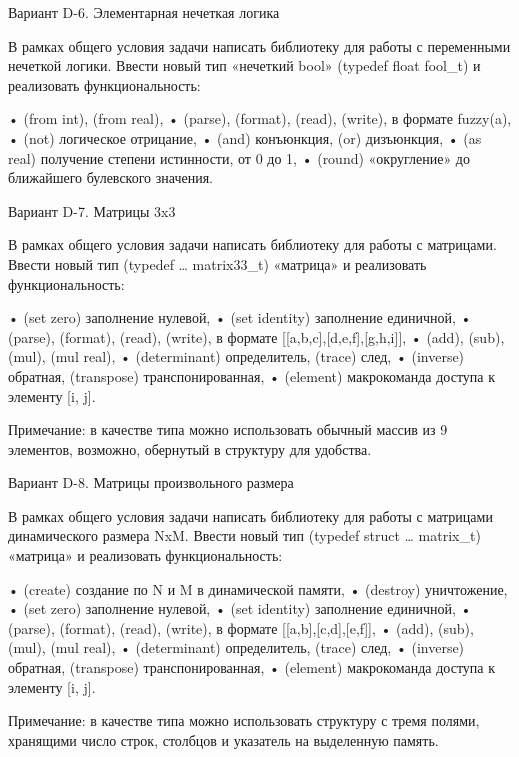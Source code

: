 
Вариант D-6. Элементарная нечеткая логика

В рамках общего условия задачи написать библиотеку для работы с переменными
нечеткой логики. Ввести новый тип «нечеткий bool» (typedef float fool_t) и
реализовать функциональность:

•	(from int), (from real),
•	(parse), (format), (read), (write), в формате fuzzy(a),
•	(not) логическое отрицание,
•	(and) конъюнкция, (or) дизъюнкция,
•	(as real) получение степени истинности, от 0 до 1,
•	(round) «округление» до ближайшего булевского значения.


Вариант D-7. Матрицы 3x3

В рамках общего условия задачи написать библиотеку для работы с матрицами.
Ввести новый тип (typedef … matrix33_t) «матрица» и реализовать
функциональность:

•	(set zero) заполнение нулевой,
•	(set identity) заполнение единичной,
•	(parse), (format), (read), (write), в формате [[a,b,c],[d,e,f],[g,h,i]],
•	(add), (sub), (mul), (mul real),
•	(determinant) определитель, (trace) след,
•	(inverse) обратная, (transpose) транспонированная,
•	(element) макрокоманда доступа к элементу [i, j].

Примечание: в качестве типа можно использовать обычный массив из 9 элементов,
возможно, обернутый в структуру для удобства.


Вариант D-8. Матрицы произвольного размера

В рамках общего условия задачи написать библиотеку для работы с матрицами
динамического размера NxM. Ввести новый тип (typedef struct … matrix_t)
«матрица» и реализовать функциональность:

•	(create) создание по N и M в динамической памяти,
•	(destroy) уничтожение,
•	(set zero) заполнение нулевой,
•	(set identity) заполнение единичной, 
•	(parse), (format), (read), (write), в формате [[a,b],[c,d],[e,f]],
•	(add), (sub), (mul), (mul real),
•	(determinant) определитель, (trace) след,
•	(inverse) обратная, (transpose) транспонированная,
•	(element) макрокоманда доступа к элементу [i, j].

Примечание: в качестве типа можно использовать структуру с тремя полями,
хранящими число строк, столбцов и указатель на выделенную память.

